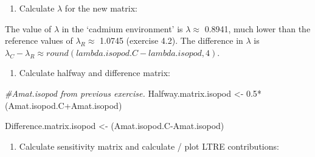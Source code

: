 \documentclass[
]{book}
\newenvironment{Shaded}{\begin{snugshade}}{\end{snugshade}}
\newcommand{\CommentTok}[1]{\textcolor[rgb]{0.56,0.35,0.01}{\textit{#1}}}
\newcommand{\FloatTok}[1]{\textcolor[rgb]{0.00,0.00,0.81}{#1}}
\newcommand{\FunctionTok}[1]{\textcolor[rgb]{0.00,0.00,0.00}{#1}}
\newcommand{\NormalTok}[1]{#1}
\newcommand{\OtherTok}[1]{\textcolor[rgb]{0.56,0.35,0.01}{#1}}
\newcommand{\SpecialCharTok}[1]{\textcolor[rgb]{0.00,0.00,0.00}{#1}}
\providecommand{\tightlist}{%
  \setlength{\itemsep}{0pt}\setlength{\parskip}{0pt}}
\begin{document}
\begin{enumerate}
\def\labelenumi{\arabic{enumi}.}
\setcounter{enumi}{1}
\tightlist
\item
  Calculate \(\lambda\) for the new matrix:
\end{enumerate}

\begin{Shaded}
\end{Shaded}

The value of \(\lambda\) in the `cadmium environment' is \(\lambda\approx\) 0.8941, much lower than the reference values of \(\lambda_R\approx\) 1.0745 (exercise 4.2). The difference in \(\lambda\) is \(\lambda_C-\lambda_R\approx round(lambda.isopod.C-lambda.isopod,4)\).

\begin{enumerate}
\def\labelenumi{\arabic{enumi}.}
\setcounter{enumi}{2}
\tightlist
\item
  Calculate halfway and difference matrix:
\end{enumerate}

\begin{Shaded}
\begin{Highlighting}[]
\CommentTok{\#Amat.isopod from previous exercise.}
\NormalTok{Halfway.matrix.isopod }\OtherTok{\textless{}{-}} \FloatTok{0.5}\SpecialCharTok{*}\NormalTok{(Amat.isopod.C}\SpecialCharTok{+}\NormalTok{Amat.isopod)}

\NormalTok{Difference.matrix.isopod }\OtherTok{\textless{}{-}}\NormalTok{ (Amat.isopod.C}\SpecialCharTok{{-}}\NormalTok{Amat.isopod)}
\end{Highlighting}
\end{Shaded}

\begin{enumerate}
\def\labelenumi{\arabic{enumi}.}
\setcounter{enumi}{3}
\tightlist
\item
  Calculate sensitivity matrix and calculate / plot LTRE contributions:
\end{enumerate}
\end{document}

